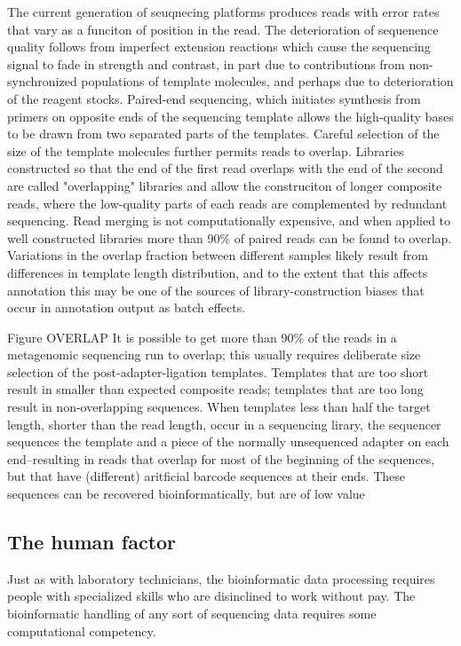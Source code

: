 \documentclass[graybox]{svmult}
\begin{document}
        The current generation of seuqnecing platforms produces reads with error rates that vary as a funciton of position in the read.  The deterioration of sequenence quality follows from imperfect extension reactions which cause the sequencing signal to fade in strength and contrast, in part due to contributions from non-synchronized populations of template molecules, and perhaps due to deterioration of the reagent stocks.   Paired-end sequencing, which initiates symthesis from primers on opposite ends of the sequencing template allows the high-quality bases to be drawn from two separated parts of the templates.  Careful selection of the size of the template molecules further permits reads to overlap.  Libraries constructed so that the end of the first read overlaps with the end of the second are called "overlapping" libraries and allow the construciton of longer composite reads, where the low-quality parts of each reads are complemented by redundant sequencing.  Read merging is not computationally expensive, and when applied to well constructed libraries more than 90\% of paired reads can be found to overlap.  Variations in the overlap fraction between different samples likely result from differences in template length distribution, and to the extent that this affects annotation this may be one of the sources of library-construction biases that occur in annotation output as batch effects.

Figure OVERLAP
        It is possible to get more than 90\% of the reads in a metagenomic sequencing run to overlap; this usually requires deliberate size selection of the post-adapter-ligation templates.   Templates that are too short result in smaller than expected composite reads; templates that are too long result in non-overlapping sequences.   When templates less than half the target length, shorter than the read length, occur in a sequencing lirary, the sequencer sequences the template and a piece of the normally unsequenced adapter on each end--resulting in reads that overlap for most of the beginning of the sequences, but that have (different) aritficial barcode sequences at their ends.   These sequences can be recovered bioinformatically, but are of low value

\subsection{The human factor}
Just as with laboratory technicians, the bioinformatic data processing requires people with specialized skills who are disinclined to work without pay.  
The bioinformatic handling of any sort of sequencing data requires some computational competency.
\end{document}
